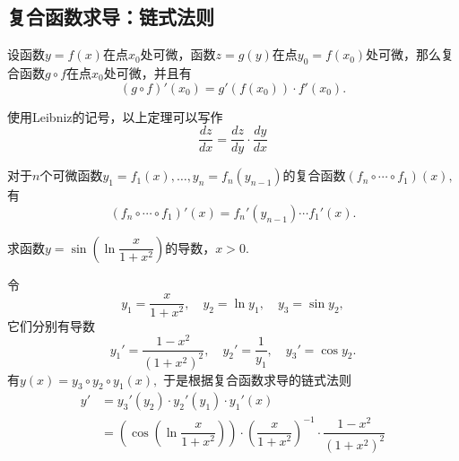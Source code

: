 
\subsection{复合函数求导：链式法则}


\begin{frame}

\begin{thm}
设函数$y=f(x)$在点$x_0$处可微，函数$z = g(y)$在点$y_0 = f(x_0)$处可微，那么复合函数$g\circ f$在点$x_0$处可微，并且有
$$(g\circ f)'(x_0) = g'(f(x_0))\cdot f'(x_0).$$
\end{thm}

\pause

使用Leibniz的记号，以上定理可以写作
$$\dfrac{dz}{dx} = \dfrac{dz}{dy} \cdot \dfrac{dy}{dx}$$

\pause

\begin{cor}
对于$n$个可微函数$y_1 = f_1(x), \ldots, y_n = f_n(y_{n-1})$的复合函数$(f_n\circ\cdots\circ f_1)(x),$ 有
$$(f_n \circ \cdots \circ f_1)'(x) = f_n'(y_{n-1}) \cdots f_1'(x).$$
\end{cor}

\end{frame}


\begin{frame}

\begin{eg}
\centering
求函数$y = \sin\left(\ln\dfrac{x}{1+x^2}\right)$的导数，$x > 0.$
\end{eg}

\pause

令
$$y_1 = \dfrac{x}{1+x^2},\quad  y_2 = \ln y_1,\quad  y_3 = \sin y_2,$$
它们分别有导数
$$y_1' = \dfrac{1-x^2}{(1+x^2)^2},\quad  y_2' = \dfrac{1}{y_1},\quad y_3' = \cos y_2.$$
有$y(x) = y_3 \circ y_2 \circ y_1(x),$ 于是根据复合函数求导的链式法则
\begin{align*}
y' & = y_3'(y_2)\cdot y_2'(y_1)\cdot y_1'(x) \\
& = \left(\cos\left(\ln\dfrac{x}{1+x^2}\right)\right) \cdot \left(\dfrac{x}{1+x^2}\right)^{-1} \cdot \dfrac{1-x^2}{(1+x^2)^2}
\end{align*}

\end{frame}

